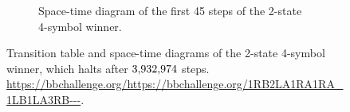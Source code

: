 \begin{figure}[h!]
\begin{subfigure}[t]{0.45\textwidth}
        \caption{Space-time diagram of the first 45 steps of the 2-state 4-symbol winner.}
        \label{fig:bb2x4-diagram}
    \end{subfigure}
    \caption{Transition table and space-time diagrams of the 2-state 4-symbol \BBfull winner, which halts after $3{,}932{,}974$ steps.
        \url{https://bbchallenge.org/https://bbchallenge.org/1RB2LA1RA1RA_1LB1LA3RB---}.}
    \label{fig:bb2x4}
\end{figure}

